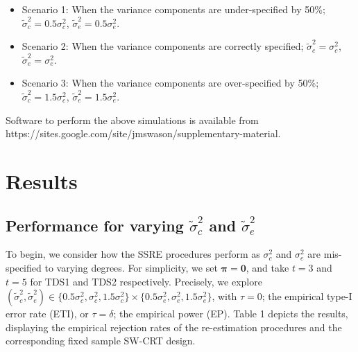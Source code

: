 \documentclass{article}
\begin{document}
\begin{itemize}
	\item Scenario 1: When the variance components are under-specified by 50\%; $\tilde{\sigma}_c^2=0.5\sigma_c^2$, $\tilde{\sigma}_e^2=0.5\sigma_e^2$.\\
	\item Scenario 2: When the variance components are correctly specified; $\tilde{\sigma}_c^2=\sigma_c^2$, $\tilde{\sigma}_e^2=\sigma_e^2$.\\
	\item Scenario 3: When the variance components are over-specified by 50\%; $\tilde{\sigma}_c^2=1.5\sigma_c^2$, $\tilde{\sigma}_e^2=1.5\sigma_e^2$.\\
\end{itemize}

Software to perform the above simulations is available from https://sites.google.com/site/jmswason/supplementary-material.

\section{Results}

\subsection{Performance for varying $\tilde{\sigma}_c^2$ and $\tilde{\sigma}_e^2$}

To begin, we consider how the SSRE procedures perform as $\sigma_c^2$ and $\sigma_e^2$ are mis-specified to varying degrees. For simplicity, we set $\boldsymbol{\pi}=\boldsymbol{0}$, and take $t=3$ and $t=5$ for TDS1 and TDS2 respectively. Precisely, we explore $(\tilde{\sigma}_c^2,\tilde{\sigma}_e^2) \in \{0.5\sigma_c^2,\sigma_c^2,1.5\sigma_c^2\}\times\{0.5\sigma_e^2,\sigma_e^2,1.5\sigma_e^2\}$, with $\tau=0$; the empirical type-I error rate (ETI), or $\tau=\delta$;  the empirical power (EP). Table 1 depicts the results, displaying the empirical rejection rates of the re-estimation procedures and the corresponding fixed sample SW-CRT design.
\end{document}
